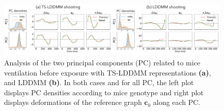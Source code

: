 \begin{figure}
  \centering
  \includegraphics[width=\linewidth]{pictures/shooting before/shooting before.pdf}
  \caption{Analysis of the two principal components (PC) related to mice ventilation before exposure with TS-LDDMM representations \textbf{(a)}, and LDDMM \textbf{(b)}. In both cases and for all PC, the left plot displays PC densities according to mice genotype and right plot displays deformations of the reference graph $\mathbf{c}_0$ along each PC.}
  \label{fig:exp1}
  \vspace{-1.5em}
\end{figure}

